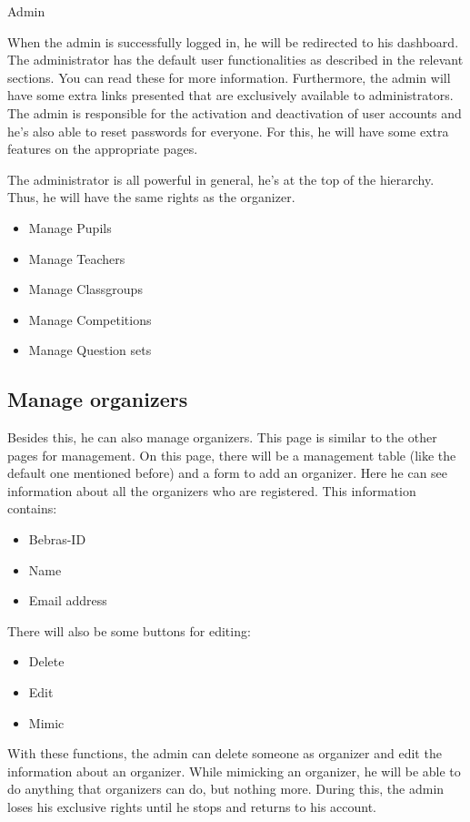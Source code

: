 \begin{section}{Admin}

When the admin is successfully logged in, he will be redirected to his dashboard. The administrator has the default user functionalities as described in the relevant sections. You can read these for more information. Furthermore, the admin will have some extra links presented that are exclusively available to administrators. \\
The admin is responsible for the activation and deactivation of user accounts and he's also able to reset passwords for everyone. For this, he will have some extra features on the appropriate pages.

The administrator is all powerful in general, he's at the top of the hierarchy. Thus, he will have the same rights as the organizer.
\begin{itemize}
\item Manage Pupils
\item Manage Teachers
\item Manage Classgroups
\item Manage Competitions
\item Manage Question sets
\end{itemize}

\subsection{Manage organizers}
Besides this, he can also manage organizers. This page is similar to the other pages for management. On this page, there will be a management table (like the default one mentioned before) and a form to add an organizer. Here he can see information about all the organizers who are registered. This information contains:
\begin{itemize}
\item Bebras-ID
\item Name
\item Email address
\end{itemize}

There will also be some buttons for editing:
\begin{itemize}
\item Delete
\item Edit
\item Mimic
\end{itemize}

With these functions, the admin can delete someone as organizer and edit the information about an organizer. While mimicking an organizer, he will be able to do anything that organizers can do, but nothing more. During this, the admin loses his exclusive rights until he stops and returns to his account.


\end{section}
